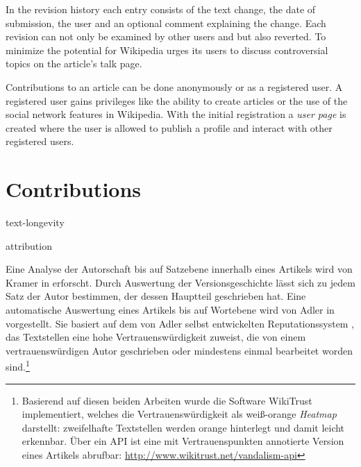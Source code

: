 In the revision history each entry consists of the text change, the date of submission, the user and an optional comment explaining the change.
Each revision can not only be examined by other users and but also reverted.
To minimize the potential for \cite{suh2007us} Wikipedia urges its users to discuss controversial topics on the article's talk page.


Contributions to an article can be done anonymously or as a registered user.
A registered user gains privileges like the ability to create articles or the use of the social network features in Wikipedia.
With the initial registration a \emph{user page} is created where the user is allowed to publish a profile and interact with other registered users.\cite{wikiwhyaccount}


\section{Contributions}\label{sec:contribution}


\begin{todos}
    \item text-longevity
    \item attribution
\end{todos}

Eine Analyse der Autorschaft bis auf Satzebene innerhalb eines Artikels wird von Kramer in \cite{kramer2008wiki} erforscht.
Durch Auswertung der Versionsgeschichte lässt sich zu jedem Satz der Autor bestimmen, der dessen Hauptteil geschrieben hat.
Eine automatische Auswertung eines Artikels bis auf Wortebene wird von Adler in \cite{adler2008assigning} vorgestellt.
Sie basiert auf dem von Adler selbst entwickelten Reputationssystem \cite{adler2007content}, das Textstellen eine hohe Vertrauenswürdigkeit zuweist, die von einem vertrauenswürdigen Autor geschrieben oder mindestens einmal bearbeitet worden sind.\footnote{Basierend auf diesen beiden Arbeiten wurde die Software WikiTrust implementiert, welches die Vertrauenswürdigkeit als weiß-orange \emph{Heatmap} darstellt: zweifelhafte Textstellen werden orange hinterlegt und damit leicht erkennbar. Über ein API ist eine mit Vertrauenspunkten annotierte Version eines Artikels abrufbar: \url{http://www.wikitrust.net/vandalism-api}\label{wikitrust}}

